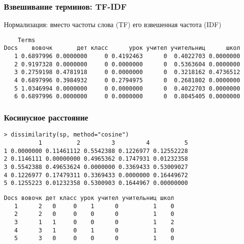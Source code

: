 \documentclass[svgnames]{beamer}
\begin{document}
\begin{frame}[fragile]
  \frametitle{Взвешивание терминов: TF-IDF}
  Нормализация: вместо частоты слова (TF) его взвешенная частота (IDF)
  \footnotesize
\begin{verbatim}
    Terms
Docs    вовочк       дет класс      урок учител учительниц      школ
   1 0.6897996 0.0000000     0 0.4192463      0  0.4022703 0.0000000
   2 0.9197328 0.0000000     0 0.0000000      0  0.5363604 0.0000000
   3 0.2759198 0.4781918     0 0.0000000      0  0.3218162 0.4736512
   4 0.6897996 0.3984932     0 0.2794975      0  0.2681802 0.0000000
   5 1.0346994 0.0000000     0 0.0000000      0  0.4022703 0.0000000
   6 0.6897996 0.0000000     0 0.0000000      0  0.8045405 0.0000000
\end{verbatim}
\end{frame}

\begin{frame}[fragile]
  \frametitle{Косинусное расстояние}

  \footnotesize
\begin{verbatim}
> dissimilarity(sp, method="cosine")
          1          2         3         4          5
1 0.0000000 0.11461112 0.5542388 0.1226977 0.12552228
2 0.1146111 0.00000000 0.4965362 0.1747931 0.01232358
3 0.5542388 0.49653624 0.0000000 0.3369433 0.53009027
4 0.1226977 0.17479311 0.3369433 0.0000000 0.16449672
5 0.1255223 0.01232358 0.5300903 0.1644967 0.00000000
\end{verbatim}

  \footnotesize
\begin{verbatim}
Docs вовочк дет класс урок учител учительниц школ
   1      2   0     0    1      0          1    0
   2      2   0     0    0      0          1    0
   3      1   1     0    0      0          1    2
   4      3   1     0    1      0          1    0
   5      3   0     0    0      0          1    0
\end{verbatim}

\end{frame}
\end{document}

